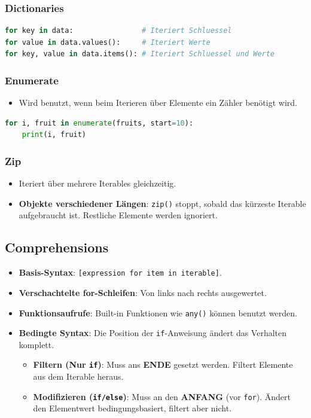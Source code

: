 \subsubsection{Dictionaries}
\begin{lstlisting}[language=Python]
for key in data:                # Iteriert Schluessel
for value in data.values():     # Iteriert Werte
for key, value in data.items(): # Iteriert Schluessel und Werte
\end{lstlisting}

\subsubsection{Enumerate}
\begin{itemize}
    \item Wird benutzt, wenn beim Iterieren über Elemente ein Zähler benötigt wird.
\end{itemize}

\begin{lstlisting}[language=Python]
for i, fruit in enumerate(fruits, start=10):
    print(i, fruit)
\end{lstlisting}

\subsubsection{Zip}
\begin{itemize}
    \item Iteriert über mehrere Iterables gleichzeitig.
    \item \textbf{Objekte verschiedener Längen}: \texttt{zip()} stoppt, sobald das kürzeste Iterable aufgebraucht ist. Restliche Elemente werden ignoriert.
\end{itemize}



\subsection{Comprehensions}
\begin{itemize}
    \item \textbf{Basis-Syntax}: \texttt{[expression for item in iterable]}.
    \item \textbf{Verschachtelte for-Schleifen}: Von links nach rechts ausgewertet.
    \item \textbf{Funktionsaufrufe}: Built-in Funktionen wie \texttt{any()} können benutzt werden.
    \item \textbf{\color{red}Bedingte Syntax}: Die Position der \texttt{if}-Anweisung ändert das Verhalten komplett. 
    \begin{itemize}
        \item \textbf{Filtern (Nur \texttt{if})}: Muss ans \textbf{\color{orange}ENDE} gesetzt werden. Filtert Elemente aus dem Iterable heraus.
        \item \textbf{Modifizieren (\texttt{if/else})}: Muss an den \textbf{\color{orange}ANFANG} (vor \texttt{for}). Ändert den Elementwert bedingungsbasiert, filtert aber nicht.
    \end{itemize}
\end{itemize}

